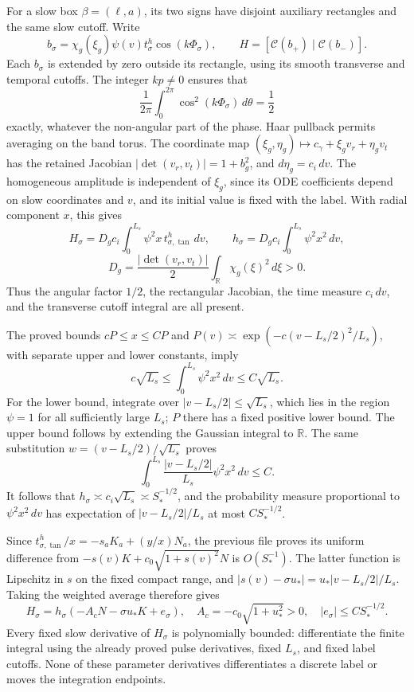 \documentclass[10pt,a4paper]{article}
\begin{document}
For a slow box \(\beta=(\ell,a)\), its two signs have disjoint auxiliary rectangles and the same slow cutoff. Write \[
b_\sigma=\chi_g(\xi_g)\psi(v)t_\sigma^h\cos(k\Phi_\sigma),\qquad
H=[\mathcal C(b_+)\mid\mathcal C(b_-)].
\] Each \(b_\sigma\) is extended by zero outside its rectangle, using its smooth transverse and temporal cutoffs. The integer \(kp\ne0\) ensures that \[
\frac1{2\pi}\int_0^{2\pi}\cos^2(k\Phi_\sigma)\,d\theta=\frac12
\] exactly, whatever the non-angular part of the phase. Haar pullback permits averaging on the band torus. The coordinate map \((\xi_g,\eta_g)\mapsto c_\gamma+\xi_gv_r+\eta_gv_t\) has the retained Jacobian \(|\det(v_r,v_t)|=1+b_g^2\), and \(d\eta_g=c_i\,dv\). The homogeneous amplitude is independent of \(\xi_g\), since its ODE coefficients depend on slow coordinates and \(v\), and its initial value is fixed with the label. With radial component \(x\), this gives \[
H_\sigma=D_g c_i\int_0^{L_s}\psi^2x\,t_{\sigma,\tan}^h\,dv,\qquad
h_\sigma=D_g c_i\int_0^{L_s}\psi^2x^2\,dv,
\] \[
D_g=\frac{|\det(v_r,v_t)|}{2}\int_{\mathbb R}\chi_g(\xi)^2\,d\xi>0.
\] Thus the angular factor \(1/2\), the rectangular Jacobian, the time measure \(c_i\,dv\), and the transverse cutoff integral are all present.

The proved bounds \(cP\le x\le CP\) and \(P(v)\asymp\exp(-c(v-L_s/2)^2/L_s)\), with separate upper and lower constants, imply \[
c\sqrt{L_s}\le\int_0^{L_s}\psi^2x^2\,dv\le C\sqrt{L_s}.
\] For the lower bound, integrate over \(|v-L_s/2|\le\sqrt{L_s}\), which lies in the region \(\psi=1\) for all sufficiently large \(L_s\); \(P\) there has a fixed positive lower bound. The upper bound follows by extending the Gaussian integral to \(\mathbb R\). The same substitution \(w=(v-L_s/2)/\sqrt{L_s}\) proves \[
\int_0^{L_s}\frac{|v-L_s/2|}{L_s}\psi^2x^2\,dv\le C.
\] It follows that \(h_\sigma\asymp c_i\sqrt{L_s}\asymp S_*^{-1/2}\), and the probability measure proportional to \(\psi^2x^2\,dv\) has expectation of \(|v-L_s/2|/L_s\) at most \(CS_*^{-1/2}\).

Since \(t_{\sigma,\tan}^h/x=-s_aK_a+(y/x)N_a\), the previous file proves its uniform difference from \(-s(v)K+c_0\sqrt{1+s(v)^2}N\) is \(O(S_*^{-1})\). The latter function is Lipschitz in \(s\) on the fixed compact range, and \(|s(v)-\sigma u_*|=u_*|v-L_s/2|/L_s\). Taking the weighted average therefore gives \[
H_\sigma=h_\sigma(-A_cN-\sigma u_*K+e_\sigma),\quad
A_c=-c_0\sqrt{1+u_*^2}>0,\quad |e_\sigma|\le CS_*^{-1/2}.
\] Every fixed slow derivative of \(H_\sigma\) is polynomially bounded: differentiate the finite integral using the already proved pulse derivatives, fixed \(L_s\), and fixed label cutoffs. None of these parameter derivatives differentiates a discrete label or moves the integration endpoints.
\end{document}
